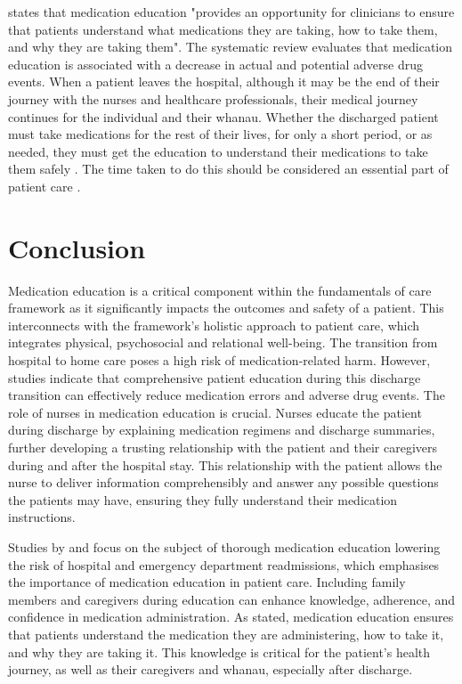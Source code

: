 \documentclass[british,12pt,a4paper]{article}
\begin{document}
\textcite{Alper2023} states that medication education "provides an opportunity for clinicians to ensure that patients understand what medications they are taking, how to take them, and why they are taking them". The systematic review evaluates that medication education is associated with a decrease in actual and potential adverse drug events. When a patient leaves the hospital, although it may be the end of their journey with the nurses and healthcare professionals, their medical journey continues for the individual and their whanau. Whether the discharged patient must take medications for the rest of their lives, for only a short period, or as needed, they must get the education to understand their medications to take them safely \parencite{Yap2016}. The time taken to do this should be considered an essential part of patient care \parencite{Flatman2021}.

\section{Conclusion}
Medication education is a critical component within the fundamentals of care framework as it significantly impacts the outcomes and safety of a patient. This interconnects with the framework's holistic approach to patient care, which integrates physical, psychosocial and relational well-being. The transition from hospital to home care poses a high risk of medication-related harm. However, studies indicate that comprehensive patient education during this discharge transition can effectively reduce medication errors and adverse drug events. The role of nurses in medication education is crucial. Nurses educate the patient during discharge by explaining medication regimens and discharge summaries, further developing a trusting relationship with the patient and their caregivers during and after the hospital stay. This relationship with the patient allows the nurse to deliver information comprehensibly and answer any possible questions the patients may have, ensuring they fully understand their medication instructions.

Studies by \textcite{Alper2023} and \textcite{Phatak2015} focus on the subject of thorough medication education lowering the risk of hospital and emergency department readmissions, which emphasises the importance of medication education in patient care. Including family members and caregivers during education can enhance knowledge, adherence, and confidence in medication administration. As \citeauthor{Alper2023} stated, medication education ensures that patients understand the medication they are administering, how to take it, and why they are taking it. This knowledge is critical for the patient's health journey, as well as their caregivers and whanau, especially after discharge.
\end{document}
